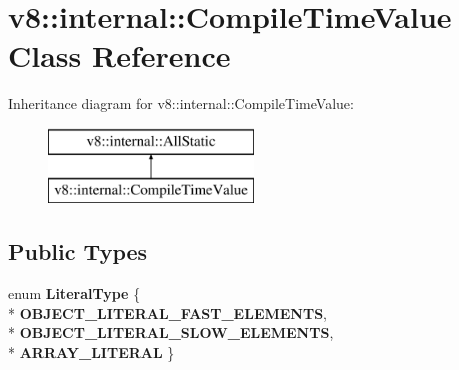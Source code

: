 \hypertarget{classv8_1_1internal_1_1_compile_time_value}{}\section{v8\+:\+:internal\+:\+:Compile\+Time\+Value Class Reference}
\label{classv8_1_1internal_1_1_compile_time_value}
Inheritance diagram for v8\+:\+:internal\+:\+:Compile\+Time\+Value\+:\begin{figure}[H]
\begin{center}
\leavevmode
\includegraphics[height=2.000000cm]{classv8_1_1internal_1_1_compile_time_value}
\end{center}
\end{figure}
\subsection*{Public Types}
\begin{DoxyCompactItemize}
\item 
enum {\bfseries Literal\+Type} \{ \\*
{\bfseries O\+B\+J\+E\+C\+T\+\_\+\+L\+I\+T\+E\+R\+A\+L\+\_\+\+F\+A\+S\+T\+\_\+\+E\+L\+E\+M\+E\+N\+TS}, 
\\*
{\bfseries O\+B\+J\+E\+C\+T\+\_\+\+L\+I\+T\+E\+R\+A\+L\+\_\+\+S\+L\+O\+W\+\_\+\+E\+L\+E\+M\+E\+N\+TS}, 
\\*
{\bfseries A\+R\+R\+A\+Y\+\_\+\+L\+I\+T\+E\+R\+AL}
 \}\hypertarget{classv8_1_1internal_1_1_compile_time_value_a7a47587d35656f957544909d0b5e4fb5}{}\label{classv8_1_1internal_1_1_compile_time_value_a7a47587d35656f957544909d0b5e4fb5}

\end{DoxyCompactItemize}
